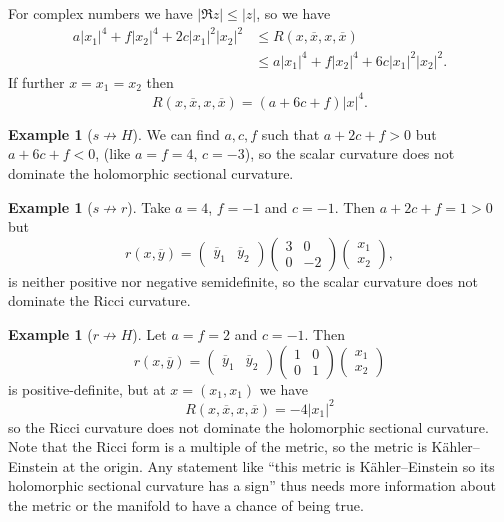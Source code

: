 \documentclass[10pt,a4paper]{amsart}
\theoremstyle{definition}
\newtheorem{exam}[theo]{Example}
\def\ov#1{\overline{#1}}
\begin{document}
For complex numbers we have $|\Re z| \leq |z|$, so we have
\begin{align*}
a |x_1|^4 + f |x_2|^4 + 2c |x_1|^2 |x_2|^2
&\leq R(x, \ov x, x, \ov x)
\\
&\leq a |x_1|^4 + f |x_2|^4 + 6c |x_1|^2 |x_2|^2.
\end{align*}
If further $x = x_1 = x_2$ then
$$
R(x, \ov x, x, \ov x)
= (a + 6c + f) |x|^4.
$$

\begin{exam}[$s \not\to H$]
We can find $a, c, f$ such that $a + 2c + f > 0$ but $a + 6c + f < 0$,
(like $a = f = 4$, $c = -3$), so the scalar curvature does not dominate
the holomorphic sectional curvature.
\end{exam}

\begin{exam}[$s \not\to r$]
Take $a = 4$, $f = -1$ and $c = -1$. Then $a + 2c + f = 1 > 0$ but
$$
r(x, \ov y) =
\begin{pmatrix}\ov y_1 & \ov y_2 \end{pmatrix}
\begin{pmatrix}
3 & 0 \\ 0 & -2
\end{pmatrix}
\begin{pmatrix} x_1 \\ x_2 \end{pmatrix},
$$
is neither positive nor negative semidefinite, so the scalar curvature
does not dominate the Ricci curvature.
\end{exam}

\begin{exam}[$r \not\to H$]
Let $a = f = 2$ and $c = -1$. Then
$$
r(x, \ov y) =
\begin{pmatrix}\ov y_1 & \ov y_2 \end{pmatrix}
\begin{pmatrix}
1 & 0 \\ 0 & 1
\end{pmatrix}
\begin{pmatrix} x_1 \\ x_2 \end{pmatrix}
$$
is positive-definite, but at $x = (x_1, x_1)$ we have
$$
R(x, \ov x, x, \ov x) = -4 |x_1|^2
$$
so the Ricci curvature does not dominate the holomorphic sectional curvature.
Note that the Ricci form is a multiple of the metric, so the metric is
K\"ahler--Einstein at the origin.
Any statement like ``this metric is K\"ahler--Einstein so its holomorphic
sectional curvature has a sign'' thus needs more information about the metric
or the manifold to have a chance of being true.
\end{exam}
\end{document}
